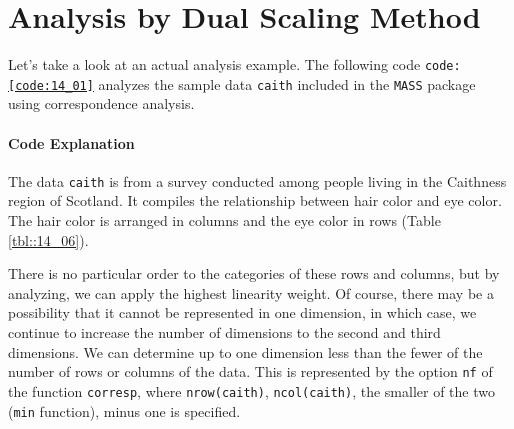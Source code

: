 \documentclass{ltjsbook}
\begin{document}
\section{Analysis by Dual Scaling Method}
Let's take a look at an actual analysis example. The following code \texttt{code:\ref{code:14_01}} analyzes the sample data \texttt{caith} included in the \texttt{MASS} package using correspondence analysis.



\paragraph{Code Explanation}


The data \texttt{caith} is from a survey conducted among people living in the Caithness region of Scotland. It compiles the relationship between hair color and eye color. The hair color is arranged in columns and the eye color in rows (Table \ref{tbl::14_06}).



There is no particular order to the categories of these rows and columns, but by analyzing, we can apply the highest linearity weight. Of course, there may be a possibility that it cannot be represented in one dimension, in which case, we continue to increase the number of dimensions to the second and third dimensions. We can determine up to one dimension less than the fewer of the number of rows or columns of the data. This is represented by the option \texttt{nf} of the function \texttt{corresp}, where \texttt{nrow(caith)}, \texttt{ncol(caith)}, the smaller of the two (\texttt{min} function), minus one is specified.
\end{document}
